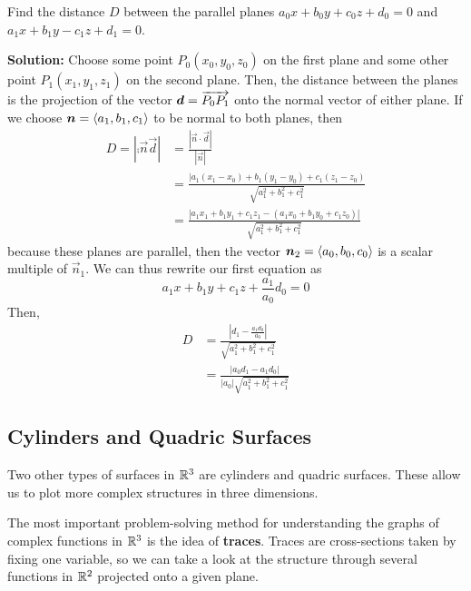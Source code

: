 \begin{example}
    Find the distance \(D\) between the parallel planes \(a_0x+b_0y+c_0z+d_0=0\) and \(a_1x+b_1y-c_1z+d_1=0\). \par\textbf{Solution: }Choose some point \(P_0(x_0,y_0,z_0)\) on the first plane and some other point \(P_1(x_1,y_1,z_1)\) on the second plane. Then, the distance between the planes is the projection of the vector \(\boldsymbol{d} = \overrightarrow{P_0P_1}\) onto the normal vector of either plane. If we choose \(\boldsymbol{n} = \left\langle a_1,b_1,c_1\right\rangle\) to be normal to both planes, then
    \begin{align*}
        D = |\comp{\vec n}{\vec d}| &= \frac{|\vec n \cdot \vec d|}{|\vec n|} \\
        &= \frac{|a_1(x_1-x_0)+b_1(y_1-y_0)+c_1(z_1-z_0)}{\sqrt{a_1^2+b_1^2+c_1^2}} \\
        &= \frac{|a_1x_1+b_1y_1+c_1z_1 - (a_1x_0+b_1y_0+c_1z_0)|}{\sqrt{a_1^2+b_1^2+c_1^2}}
    \end{align*}
    because these planes are parallel, then the vector \(\boldsymbol{n}_2=\left\langle a_0,b_0,c_0\right\rangle\) is a scalar multiple of \(\vec n_1\). We can thus rewrite our first equation as 
    \[a_1x+b_1y+c_1z+\frac{a_1}{a_0}d_0=0\]
    Then,
    \begin{align*}
        D &= \frac{|d_1- \frac{a_1d_0}{a_0}|}{\sqrt{a_1^2+b_1^2+c_1^2}} \\
        &= \frac{|a_0d_1-a_1d_0|}{|a_0|\sqrt{a_1^2+b_1^2+c_1^2}}
    \end{align*}
\end{example}
\subsection{Cylinders and Quadric Surfaces}
Two other types of surfaces in \(\mathbb{R}^3\) are cylinders and quadric surfaces. These allow us to plot more complex structures in three dimensions. \par
The most important problem-solving method for understanding the graphs of complex functions in \(\mathbb{R}^3\) is the idea of \textbf{traces}. Traces are cross-sections taken by fixing one variable, so we can take a look at the structure through several functions in \(\mathbb{R}^2\) projected onto a given plane.

